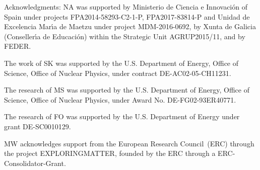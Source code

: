 {\footnotesize Acknowledgments: 
NA was supported by Ministerio de Ciencia e Innovaci\'on of Spain under projects FPA2014-58293-C2-1-P, FPA2017-83814-P and Unidad de Excelencia Mar\'{\i}a de Maetzu under project MDM-2016-0692, by Xunta de Galicia (Conseller\'{\i}a de Educaci\'on) within the Strategic Unit AGRUP2015/11, and by FEDER. 

The work of SK was supported by the U.S. Department of Energy, Office of Science, Office of Nuclear Physics, under contract DE-AC02-05-CH11231.

The research of MS was supported by the U.S. Department of Energy, Office of Science, Office of Nuclear Physics, under Award No. DE-FG02-93ER40771.

The research of FO was supported by the U.S. Department of Energy under grant  DE-SC0010129.

MW acknowledges support from the European Research Council~(ERC) through the project EXPLORINGMATTER, founded by the ERC through a ERC-Consolidator-Grant.
 }
 
